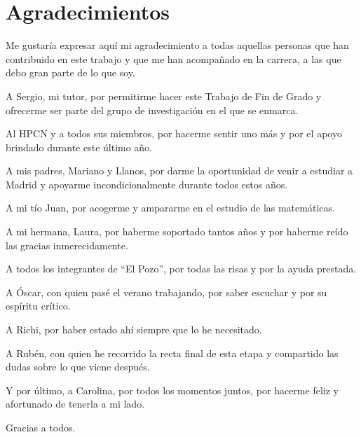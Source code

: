 \chapter*{Agradecimientos}

\noindent
Me gustaría expresar aquí mi agradecimiento a todas aquellas personas que han contribuido en este trabajo y que me han acompañado en la carrera, a las que debo gran parte de lo que soy.

\noindent
A Sergio, mi tutor, por permitirme hacer este Trabajo de Fin de Grado y ofrecerme ser parte del grupo de investigación en el que se enmarca.

\noindent
Al HPCN y a todos sus miembros, por hacerme sentir uno más y por el apoyo brindado durante este último año.

\noindent
A mis padres, Mariano y Llanos, por darme la oportunidad de venir a estudiar a Madrid y apoyarme incondicionalmente durante todos estos años.

\noindent
A mi tío Juan, por acogerme y ampararme en el estudio de las matemáticas.

\noindent
A mi hermana, Laura, por haberme soportado tantos años y por haberme reído las gracias inmerecidamente.

\noindent
A todos los integrantes de ``El Pozo'', por todas las risas y por la ayuda prestada.

\noindent
A Óscar, con quien pasé el verano trabajando, por saber escuchar y por su espíritu crítico.

\noindent
A Richi, por haber estado ahí siempre que lo he necesitado.

\noindent
A Rubén, con quien he recorrido la recta final de esta etapa y compartido las dudas sobre lo que viene después.

\noindent
Y por último, a Carolina, por todos los momentos juntos, por hacerme feliz y afortunado de tenerla a mi lado.

\noindent
Gracias a todos.
